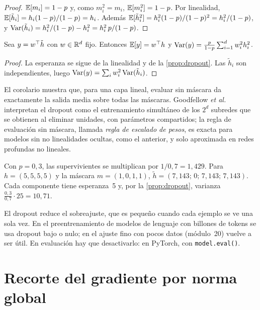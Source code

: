 \begin{proof}
$\mathbb{E}[m_i]=1-p$ y, como $m_i^{2}=m_i$, $\mathbb{E}[m_i^{2}]=1-p$. Por linealidad, $\mathbb{E}[\tilde h_i]=h_i(1-p)/(1-p)=h_i$. Además $\mathbb{E}[\tilde h_i^{2}]=h_i^{2}(1-p)/(1-p)^{2}=h_i^{2}/(1-p)$, y $\operatorname{Var}(\tilde h_i)=h_i^{2}/(1-p)-h_i^{2}=h_i^{2}\,p/(1-p)$.
\end{proof}

\begin{corolario}\label{cor:dropout-lineal}
Sea $y=w^{\top}\tilde h$ con $w\in\mathbb{R}^{d}$ fijo. Entonces $\mathbb{E}[y]=w^{\top} h$ y $\operatorname{Var}(y)=\frac{p}{1-p}\sum_{i=1}^{d}w_i^{2}h_i^{2}$.
\end{corolario}

\begin{proof}
La esperanza se sigue de la linealidad y de la \cref{prop:dropout}. Las $\tilde h_i$ son independientes, luego $\operatorname{Var}(y)=\sum_iw_i^{2}\operatorname{Var}(\tilde h_i)$.
\end{proof}

El corolario muestra que, para una capa lineal, evaluar sin máscara da exactamente la salida media sobre todas las máscaras. Goodfellow \emph{et al.}~\cite[§7.12]{gbc} interpretan el dropout como el entrenamiento simultáneo de los $2^{d}$ subredes que se obtienen al eliminar unidades, con parámetros compartidos; la regla de evaluación sin máscara, llamada \emph{regla de escalado de pesos}, es exacta para modelos sin no linealidades ocultas, como el anterior, y solo aproximada en redes profundas no lineales.

\begin{ejemplo}\label{ej:dropout}
Con $p=0{,}3$, las supervivientes se multiplican por $1/0{,}7=1{,}429$. Para $h=(5,5,5,5)$ y la máscara $m=(1,0,1,1)$, $\tilde h=(7{,}143;\,0;\,7{,}143;\,7{,}143)$. Cada componente tiene esperanza~5 y, por la \cref{prop:dropout}, varianza $\frac{0{,}3}{0{,}7}\cdot 25=10{,}71$.
\end{ejemplo}

\begin{observacion}
El dropout reduce el sobreajuste, que es pequeño cuando cada ejemplo se ve una sola vez. En el preentrenamiento de modelos de lenguaje con billones de tokens se usa dropout bajo o nulo; en el ajuste fino con pocos datos (módulo~20) vuelve a ser útil. En evaluación hay que desactivarlo: en PyTorch, con \texttt{model.eval()}.
\end{observacion}

\section{Recorte del gradiente por norma global}

